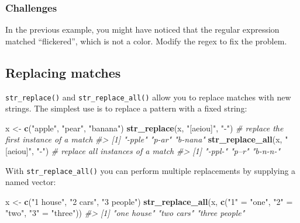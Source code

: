 \documentclass[]{book}
\newenvironment{Shaded}{\begin{snugshade}}{\end{snugshade}}
\newcommand{\CommentTok}[1]{\textcolor[rgb]{0.56,0.35,0.01}{\textit{#1}}}
\newcommand{\KeywordTok}[1]{\textcolor[rgb]{0.13,0.29,0.53}{\textbf{#1}}}
\newcommand{\NormalTok}[1]{#1}
\newcommand{\StringTok}[1]{\textcolor[rgb]{0.31,0.60,0.02}{#1}}
\begin{document}
\hypertarget{challenges-18}{%
\subsubsection*{Challenges}\label{challenges-18}}

In the previous example, you might have noticed that the regular expression matched ``flickered'', which is not a color. Modify the regex to fix the problem.

\hypertarget{replacing-matches}{%
\subsection{Replacing matches}\label{replacing-matches}}

\texttt{str\_replace()} and \texttt{str\_replace\_all()} allow you to replace matches with new strings. The simplest use is to replace a pattern with a fixed string:

\begin{Shaded}
\begin{Highlighting}[]
\NormalTok{x <-}\StringTok{ }\KeywordTok{c}\NormalTok{(}\StringTok{"apple"}\NormalTok{, }\StringTok{"pear"}\NormalTok{, }\StringTok{"banana"}\NormalTok{)}
\KeywordTok{str_replace}\NormalTok{(x, }\StringTok{"[aeiou]"}\NormalTok{, }\StringTok{"-"}\NormalTok{) }\CommentTok{# replace the first instance of a match}
\CommentTok{#> [1] "-pple"  "p-ar"   "b-nana"}
\KeywordTok{str_replace_all}\NormalTok{(x, }\StringTok{"[aeiou]"}\NormalTok{, }\StringTok{"-"}\NormalTok{) }\CommentTok{# replace all instances of a match}
\CommentTok{#> [1] "-ppl-"  "p--r"   "b-n-n-"}
\end{Highlighting}
\end{Shaded}

With \texttt{str\_replace\_all()} you can perform multiple replacements by supplying a named vector:

\begin{Shaded}
\begin{Highlighting}[]
\NormalTok{x <-}\StringTok{ }\KeywordTok{c}\NormalTok{(}\StringTok{"1 house"}\NormalTok{, }\StringTok{"2 cars"}\NormalTok{, }\StringTok{"3 people"}\NormalTok{)}
\KeywordTok{str_replace_all}\NormalTok{(x, }\KeywordTok{c}\NormalTok{(}\StringTok{"1"}\NormalTok{ =}\StringTok{ "one"}\NormalTok{, }\StringTok{"2"}\NormalTok{ =}\StringTok{ "two"}\NormalTok{, }\StringTok{"3"}\NormalTok{ =}\StringTok{ "three"}\NormalTok{))}
\CommentTok{#> [1] "one house"    "two cars"     "three people"}
\end{Highlighting}
\end{Shaded}
\end{document}
